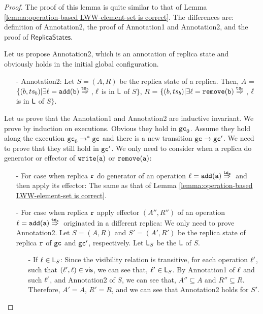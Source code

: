 \begin {proof}

The proof of this lemma is quite similar to that of Lemma \ref{lemma:operation-based LWW-element-set is correct}. The differences are: definition of Annotation2, the proof of Annotation1 and Annotation2, and the proof of $\mathsf{ReplicaStates}$.

Let us propose Annotation2, which is an annotation of replica state and obviously holds in the initial global configuration.

\begin{itemize}
\setlength{\itemsep}{0.5pt}
\item[-] Annotation2: Let $S = (A,R)$ be the replica state of a replica. Then, $A$ =  $\{ (b,\ats_b) \vert \exists \alabel = \alabellongind[{\tt add}]{b}{}{\ats_b}{}$, $\ell$ is in $\mathsf{L}$ of $S\}$,
    $R$ =  $\{ (b,\ats_b) \vert \exists \alabel = \alabellongind[{\tt remove}]{b}{}{\ats_b}{}$, $\ell$ is in $\mathsf{L}$ of $S\}$.
\end{itemize}

Let us prove that the Annotation1 and Annotation2 are inductive invariant. We prove by induction on executions. Obvious they hold in $\mathtt{gc}_0$. Assume they hold along the execution $\mathtt{gc}_0 \xrightarrow{}^* \mathtt{gc}$ and there is a new transition $\mathtt{gc} \xrightarrow{} \mathtt{gc}'$. We need to prove that they still hold in $\mathtt{gc}'$. We only need to consider when a replica do generator or effector of $\alabelshort[{\tt write}]{a}$ or $\alabelshort[{\tt remove}]{a}$:

\begin{itemize}
\setlength{\itemsep}{0.5pt}
\item[-] For case when replica $\mathtt{r}$ do generator of an operation $\alabel = \alabellongind[{\tt add}]{a}{}{\ats_a}{}$ and then apply its effector: The same as that of Lemma \ref{lemma:operation-based LWW-element-set is correct}.

\item[-] For case when replica $\mathtt{r}$ apply effector $(A'',R'')$ of an operation $\alabel = \alabellongind[{\tt add}]{a}{}{\ats_a}{}$ originated in a different replica: We only need to prove Annotation2. Let $S=(A,R)$ and $S'=(A',R')$ be the replica state of replica $\mathtt{r}$ of $\mathtt{gc}$ and $\mathtt{gc}'$, respectively. Let $\mathsf{L}_S$ be the $\mathsf{L}$ of $S$.

    \begin{itemize}
    \setlength{\itemsep}{0.5pt}
    \item[-] If $\ell \in \mathsf{L}_S$: Since the visibility relation is transitive, for each operation $\ell'$, such that $(\ell',\ell) \in \mathsf{vis}$, we can see that, $\ell' \in \mathsf{L}_S$. By Annotation1 of $\ell$ and such $\ell'$, and Annotation2 of $S$, we can see that, $A'' \subseteq A$ and $R'' \subseteq R$. Therefore, $A' = A$, $R' = R$, and we can see that Annotation2 holds for $S'$.


\end{itemize}
\end{itemize}
\end{proof}
